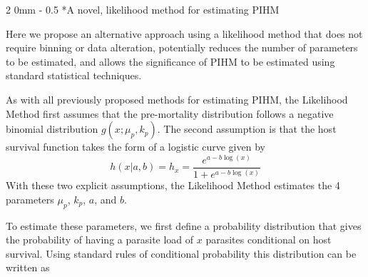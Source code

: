 \documentclass[12pt, a4paper]{article}
\makeatletter
\renewcommand{\subsection}{\@startsection
{subsection}%
{2}%
{0mm}%
{-\baselineskip}%
{0.5\baselineskip}%
{\normalfont\bf}} %
\makeatother
\begin{document}

\subsection*{A novel, likelihood method for estimating PIHM}

Here we propose an alternative approach using a likelihood method that does not
require binning or data alteration, potentially reduces the number of
parameters to be estimated, and allows the significance of PIHM to be estimated
using standard statistical techniques.

As with all previously proposed methods for estimating PIHM, the
Likelihood Method first assumes that the pre-mortality distribution follows a
negative binomial distribution $g(x; \mu_p, k_p)$.  The second
assumption is that the host survival function
takes the form of a logistic curve given by
\begin{equation}
    h(x | a, b) = h_x = \dfrac{e^{a - b \log(x)}}{1 + e^{a - b \log(x)}}
    \label{eq:logistic}
\end{equation}
With these two explicit assumptions, the Likelihood Method estimates the 4 parameters $\mu_p$, $k_p$, $a$, and $b$.

To estimate these parameters, we first define a probability distribution that gives the probability of having a parasite load of $x$ parasites conditional on host survival.  Using standard rules of conditional probability this distribution can be written as
\end{document}
